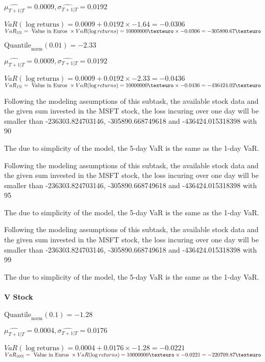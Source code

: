 $\hat{\mu_{T+1|T}} = 0.0009, \hat{\sigma_{T+1|T}} = 0.0192$

$VaR(\log \text{returns}) = 0.0009 + 0.0192\times-1.64 = -0.0306$
$VaR_{5\%} = \text{ Value in Euros } \times VaR(\log returns) = 10 000 000 \texteuro \times-0.0306 = -305890.67 \texteuro$


$\text{Quantile}_\text{norm}(0.01) = -2.33$

$\hat{\mu_{T+1|T}} = 0.0009, \hat{\sigma_{T+1|T}} = 0.0192$

$VaR(\log \text{returns}) = 0.0009 + 0.0192\times-2.33 = -0.0436$
$VaR_{1\%} = \text{ Value in Euros } \times VaR(\log returns) = 10 000 000 \texteuro \times-0.0436 = -436424.02 \texteuro$


Following the modeling assumptions of this subtask, the available stock data and the given sum invested in the MSFT stock, the loss incuring over one day will be smaller than -236303.824703146, -305890.668749618 and -436424.015318398 with 90%


The due to simplicity of the model, the 5-day VaR is the same as the 1-day VaR.



Following the modeling assumptions of this subtask, the available stock data and the given sum invested in the MSFT stock, the loss incuring over one day will be smaller than -236303.824703146, -305890.668749618 and -436424.015318398 with 95%


The due to simplicity of the model, the 5-day VaR is the same as the 1-day VaR.



Following the modeling assumptions of this subtask, the available stock data and the given sum invested in the MSFT stock, the loss incuring over one day will be smaller than -236303.824703146, -305890.668749618 and -436424.015318398 with 99%


The due to simplicity of the model, the 5-day VaR is the same as the 1-day VaR.


\paragraph{V Stock}


$\text{Quantile}_\text{norm}(0.1) = -1.28$

$\hat{\mu_{T+1|T}} = 0.0004, \hat{\sigma_{T+1|T}} = 0.0176$

$VaR(\log \text{returns}) = 0.0004 + 0.0176\times-1.28 = -0.0221$
$VaR_{10\%} = \text{ Value in Euros } \times VaR(\log returns) = 10 000 000 \texteuro \times-0.0221 = -220709.87 \texteuro$


